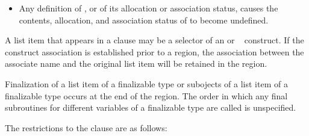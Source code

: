 \begin{fortranspecific}
\begin{itemize}
\item Any definition of , or of its allocation or association status, causes the contents,
allocation, and association status of  to become undefined.
\end{itemize}

A list item that appears in a  clause may be a selector
of an  or ~
construct. If the construct association is established prior to a  region, the
association between the associate name and the original list item will be retained in the
region.

Finalization of a list item of a finalizable type or subojects of a
list item of a finalizable type occurs at the end of the region. The
order in which any final subroutines for different variables of a
finalizable type are called is unspecified.
\end{fortranspecific}

\restrictions
The restrictions to the  clause are as follows:

